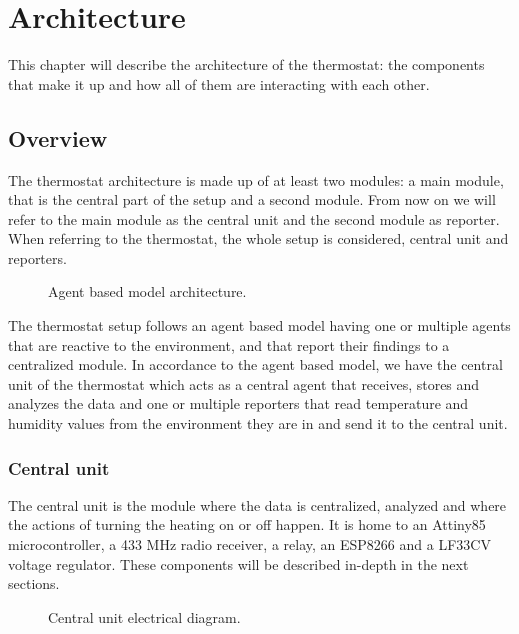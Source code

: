 \chapter{Architecture}
\label{chap:architecture}

\qquad This chapter will describe the architecture of the thermostat: the components that make it up and how
all of them are interacting with each other.

\section{Overview}

The thermostat architecture is made up of at least two modules: a main module, that is the central part of the
setup and a second module. From now on we will refer to the main module as the central unit and the second
module as reporter. When referring to the thermostat, the whole setup is considered, central unit and
reporters.

\begin{figure}[h!]
    \label{fig:general_architecture}
    \centerline{}
    \caption[Architecture Diagram]{Agent based model architecture.}
    \label{fig:general_architecture}
\end{figure}

The thermostat setup follows an agent based model having one or multiple agents that are reactive to the
environment, and that report their findings to a centralized module.
In accordance to the agent based model, we have the central unit of the thermostat which acts as a central
agent that receives, stores and analyzes the data and one or multiple reporters that read temperature and
humidity values from the environment they are in and send it to the central unit.



\subsection{Central unit}

\qquad The central unit is the module where the data is centralized, analyzed and where the actions of turning the
heating on or off happen.
It is home to an Attiny85 microcontroller, a 433 MHz radio receiver, a relay, an ESP8266 and a LF33CV voltage
regulator. These components will be described in-depth in the next sections.

\begin{figure}[h!]
    \label{fig:central_unit_diag}
    \centerline{}
    \caption[Central Unit Electrical Diagram]{Central unit electrical diagram.}
    \label{fig:central_unit_diag}
\end{figure}

